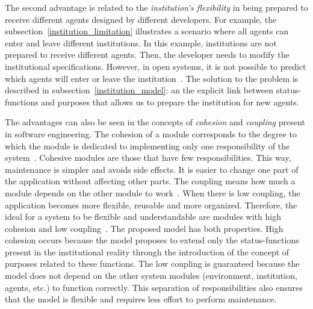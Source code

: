 \documentclass[runningheads]{llncs}
\begin{document}
The second advantage is related to the \emph{institution's flexibility} in being prepared to receive different agents designed by different developers.
For example, the subsection~\ref{institution_limitation} illustrates a scenario where all agents can enter and leave different institutions. In this example, institutions are not prepared to receive different agents. Then, the developer needs to modify the institutional specifications. %
However, in open systems, it is not possible to predict which agents will enter or leave the institution~\cite{fornara2004agent,Piunti2009}. 
The solution to the problem is described in subsection~\ref{institution_model}: an the explicit link between status-functions and purposes that allows us to prepare the institution for new agents. 


The advantages can also be seen in the concepts of \emph{cohesion} and \emph{coupling} present in software engineering. The cohesion of a module corresponds to the degree to which the module is dedicated to implementing only one responsibility of the system~\cite{pfleeger2010software}. Cohesive modules are those that have few responsibilities. This way, maintenance is simpler and avoids side effects. It is easier to change one part of the application without affecting other parts.
The coupling means how much a module depends on the other module to work~\cite{pressman2016engenharia}.
When there is low coupling, the application becomes more flexible, reusable and more organized.
Therefore, the ideal for a system to be flexible and understandable are modules with high cohesion and low coupling~\cite{pressman2016engenharia}. The proposed model has both properties.
High cohesion occurs because the model proposes to extend only the status-functions present in the institutional reality through the introduction of the concept of purposes related to these functions. The low coupling is guaranteed because the model does not depend on the other system modules (environment, institution, agents, etc.) to function correctly. This separation of responsibilities also ensures that the model is flexible and requires less effort to perform maintenance.
\end{document}
